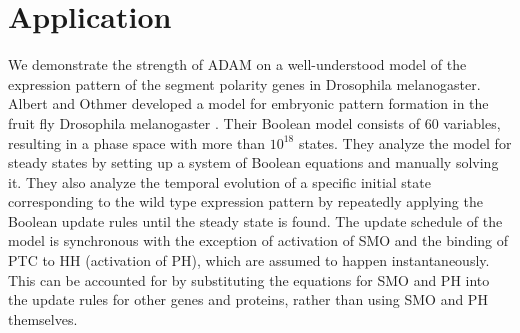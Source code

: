 \documentclass[10pt]{bmc_article}
\begin{document}
\section{Application} \label{benchmarks}
We demonstrate the strength of ADAM on a well-understood model of the expression
pattern of the segment polarity genes in Drosophila melanogaster. Albert and Othmer developed a model for embryonic pattern formation in the fruit fly Drosophila melanogaster \cite{AO}. Their Boolean
model consists of 60 variables, resulting in a phase
space with more than $10^{18}$ states. They analyze the model for steady states by setting up a system of Boolean equations and manually solving it. They also analyze the temporal evolution of a specific initial state corresponding to the wild type expression pattern by repeatedly applying the Boolean update rules until the steady state is found. The update schedule of the model is synchronous  with the exception of activation of SMO and the binding of PTC to HH (activation of PH), which are assumed to happen instantaneously. This can be accounted for by substituting the equations for SMO and PH into the update rules for other genes and proteins, rather than using SMO and PH themselves.
\end{document}
